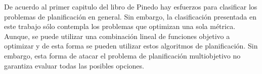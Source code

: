 De acuerdo al primer capitulo del libro de Pinedo \cite{pinedo2012scheduling} hay esfuerzos para clasificar los problemas de planificación en general. Sin embargo, la clasificación presentada en este trabajo sólo contempla los problemas que optimizan una sola métrica. Aunque, se puede utilizar una combinación lineal de funciones objetivo a optimizar y de esta forma se pueden utilizar estos algoritmos de planificación. Sin embargo, esta forma de atacar el problema de planificación multiobjetivo no garantiza evaluar todas las posibles opciones. 


